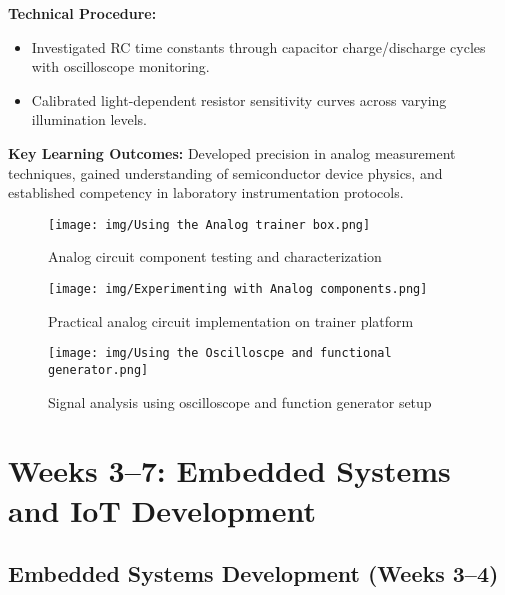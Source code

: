 \documentclass[12pt,a4paper]{report}
\begin{document}
\noindent\textbf{Technical Procedure:}
\begin{itemize}
    \item Investigated RC time constants through capacitor charge/discharge cycles with oscilloscope monitoring.
    \item Calibrated light-dependent resistor sensitivity curves across varying illumination levels.
\end{itemize}

\noindent\textbf{Key Learning Outcomes:} Developed precision in analog measurement techniques, gained understanding of semiconductor device physics, and established competency in laboratory instrumentation protocols.

\begin{figure}[H]
\centering
\begin{minipage}[t]{0.49\textwidth}
  \centering
  \texttt{[image: img/Using the Analog trainer box.png]}
  \caption{Analog circuit component testing and characterization}
  \label{fig:analog-components}
\end{minipage}
\hfill
\begin{minipage}[t]{0.49\textwidth}
  \centering
  \texttt{[image: img/Experimenting with Analog components.png]}
  \caption{Practical analog circuit implementation on trainer platform}
  \label{fig:analog-trainer}
\end{minipage}

\vspace{4em}

\begin{minipage}[t]{0.98\textwidth}
  \centering
  \texttt{[image: img/Using the Oscilloscpe and functional generator.png]}
  \caption{Signal analysis using oscilloscope and function generator setup}
  \label{fig:oscilloscope-setup}
\end{minipage}
\end{figure}

\section{Weeks 3--7: Embedded Systems and IoT Development}

\subsection{Embedded Systems Development (Weeks 3--4)}
\end{document}
